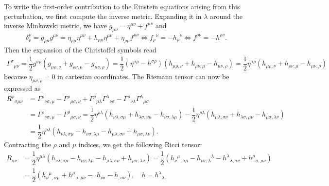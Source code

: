 \documentclass[10pt, a4paper]{article}
\begin{document}
{To write the first-order contribution to the Einstein equations arising from this perturbation, we first compute the inverse metric. Expanding it in $\lambda$ around the inverse Minkowski metric, we have $g_{\mu\nu} = \eta^{\mu \nu} + f^{\mu \nu}$ and 
\begin{align*}
 \delta_{\rho}^{\nu} = g_{\rho \mu} g^{\mu\nu} = \eta_{\rho \mu}\eta^{\mu \nu} + h_{\rho \mu} \eta^{\mu \nu} + \eta_{\rho \mu} f^{\mu \nu} \iff f_\rho{}^{\nu} = -h_{\rho}{}^{\nu} \iff f^{\rho\nu} = -h^{\rho\nu}. 
\end{align*}
Then the expansion of the Christoffel symbols read
\begin{align*}
  \Gamma^{\sigma}{}_{\mu\nu} = \dfrac{1}{2}g^{\sigma \rho}(g_{\mu \rho, \nu}+g_{\rho \nu, \mu}-g_{\mu \nu, \rho}) = \dfrac{1}{2}(\eta^{\sigma \rho}-h^{\sigma \rho})(h_{\mu \rho, \nu}+h_{\rho \nu, \mu}-h_{\mu \nu, \rho}) = \dfrac{1}{2}\eta^{\sigma \rho}(h_{\mu \rho, \nu}+h_{\rho \nu, \mu}-h_{\mu \nu, \rho})
\end{align*}
because $\eta_{\mu\nu, \rho} = 0$ in cartesian coordinates. The Riemann tensor can now be expressed as 
\begin{align*}
  R^{\rho}{}_{\sigma\mu\nu} &= \Gamma^{\rho}{}_{\nu\sigma, \mu} - \Gamma^{\rho}{}_{\mu\sigma, \nu} + \Gamma^{\rho}{}_{\mu\lambda}\Gamma^{\lambda}{}_{\nu\sigma} - \Gamma^{\rho}{}_{\nu\lambda}\Gamma^{\lambda}{}_{\mu\sigma}\\ &= \Gamma^{\rho}{}_{\nu\sigma, \mu} - \Gamma^{\rho}{}_{\mu\sigma, \nu} = \dfrac{1}{2}\eta^{\rho \lambda}(h_{\nu \lambda, \sigma \mu}+h_{\lambda \sigma, \nu \mu}-h_{\nu \sigma, \lambda \mu}) - \dfrac{1}{2}\eta^{\rho \lambda}(h_{\mu \lambda, \sigma \nu}+h_{\lambda \sigma, \mu \nu}-h_{\mu \sigma, \lambda \nu})\\
  &= \dfrac{1}{2}\eta^{\rho \lambda}(h_{\nu \lambda, \sigma \mu}-h_{\nu \sigma, \lambda \mu} - h_{\mu \lambda, \sigma \nu} + h_{\mu \sigma, \lambda \nu}).
\end{align*}
Contracting the $\rho$ and $\mu$ indices, we get the following Ricci tensor:
\begin{align*}
  R_{\sigma \nu} &= \dfrac{1}{2}\eta^{\mu \lambda}(h_{\nu \lambda, \sigma \mu}-h_{\nu \sigma, \lambda \mu} - h_{\mu \lambda, \sigma \nu} + h_{\mu \sigma, \lambda \nu}) = \dfrac{1}{2}(h_{\nu}{}^{\mu}{}_{, \sigma \mu}-h_{\nu \sigma, \lambda}{}^{\lambda} - h^{\lambda}{}_{\lambda, \sigma \nu} + h^\mu{}_{\sigma, \mu \nu})\\
  &= \dfrac{1}{2}(h_{\nu}{}^{\mu}{}_{, \sigma \mu} + h^\mu{}_{\sigma, \mu \nu}-\square h_{\nu \sigma} - h_{, \sigma \nu} ), \quad h = h^{\lambda}{}_{\lambda} 

\end{align*}}
\end{document}
